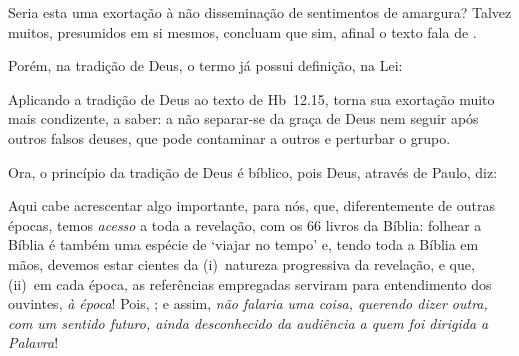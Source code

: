     Seria esta uma exortação à não disseminação de sentimentos de amargura? Talvez muitos, presumidos em si mesmos, concluam que
    sim, afinal o texto fala de .

    Porém, na tradição de Deus, o termo já possui definição, na Lei:


    Aplicando a tradição de Deus ao texto de Hb~12.15, torna sua exortação muito mais condizente, a saber: a não separar-se da
    graça de Deus nem seguir após outros falsos deuses, que pode contaminar a outros e perturbar o grupo.

    Ora, o princípio da tradição de Deus é bíblico, pois Deus, através de Paulo, diz:


    Aqui cabe acrescentar algo importante, para nós, que,  diferentemente  de  outras  épocas,  temos  \emph{acesso}  a  toda  a
    revelação, com os 66 livros da Bíblia: folhear a Bíblia é também uma espécie de `viajar no tempo' e, tendo toda a Bíblia  em
    mãos, devemos estar cientes da (i)~natureza progressiva da revelação, e que, (ii)~em cada época, as  referências  empregadas
    serviram  para  entendimento  dos  ouvintes,  \emph{à  época}!  Pois,  ; e assim, \emph{não falaria uma coisa, querendo dizer outra, com um  sentido  futuro,  ainda
    desconhecido da audiência a quem foi dirigida a Palavra}!
    


